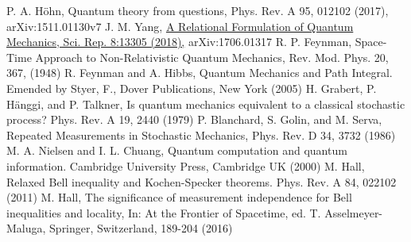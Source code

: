 \documentclass[%
 aip, 
 amsmath,amssymb,amsthm,
 nofootinbib,
 reprint,
]{revtex4-1}
\begin{document}
\begin{thebibliography}{}
 P. A. H\"{o}hn, Quantum theory from questions, Phys. Rev. A 95, 012102 (2017),  arXiv:1511.01130v7
J. M. Yang, \href{https://doi.org/10.1038/s41598-018-31481-8}{A Relational Formulation of Quantum Mechanics, Sci. Rep. 8:13305 (2018),} arXiv:1706.01317
R. P. Feynman, Space-Time Approach to Non-Relativistic Quantum Mechanics, Rev. Mod. Phys. 20, 367, (1948)
R. Feynman and A. Hibbs, Quantum Mechanics and Path Integral. Emended by Styer, F., Dover Publications, New York (2005)
 H. Grabert, P. H\"{a}nggi, and P. Talkner, Is quantum mechanics equivalent to a classical stochastic process? Phys. Rev. A 19, 2440 (1979)
 P. Blanchard, S. Golin, and M. Serva, Repeated Measurements in Stochastic Mechanics, Phys. Rev. D 34, 3732 (1986)
 M. A. Nielsen and I. L. Chuang, Quantum computation and quantum information. Cambridge University Press, Cambridge UK (2000)
M. Hall, Relaxed Bell inequality and Kochen-Specker theorems. Phys. Rev. A 84, 022102 (2011)
M. Hall, The significance of measurement independence for Bell inequalities and locality, In: At the Frontier of Spacetime, ed. T. Asselmeyer-Maluga, Springer, Switzerland, 189-204 (2016)
\end{thebibliography}
\end{document}
